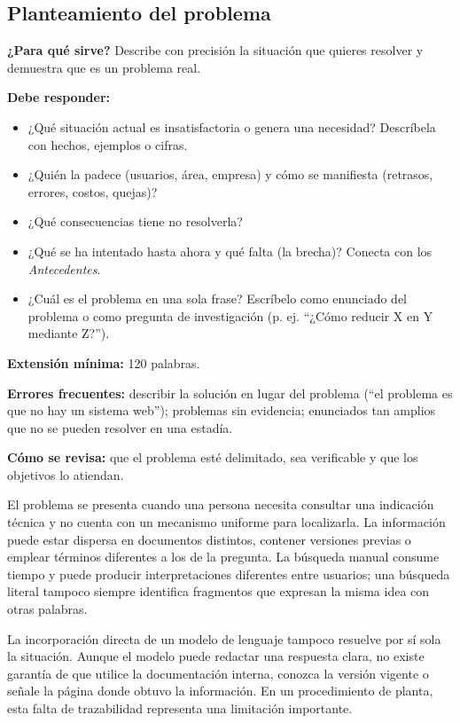\subsection{Planteamiento del problema} \label{sec:problema} %

\begin{guia}
\textbf{¿Para qué sirve?} Describe con precisión la situación que quieres resolver y demuestra que es un problema real.

\textbf{Debe responder:}
\begin{itemize}[nosep,leftmargin=*]
  \item ¿Qué situación actual es insatisfactoria o genera una necesidad? Descríbela con hechos, ejemplos o cifras.
  \item ¿Quién la padece (usuarios, área, empresa) y cómo se manifiesta (retrasos, errores, costos, quejas)?
  \item ¿Qué consecuencias tiene no resolverla?
  \item ¿Qué se ha intentado hasta ahora y qué falta (la brecha)? Conecta con los \emph{Antecedentes}.
  \item ¿Cuál es el problema en una sola frase? Escríbelo como enunciado del problema o como pregunta de
        investigación (p. ej. ``¿Cómo reducir X en Y mediante Z?'').
\end{itemize}

\textbf{Extensión mínima:} 120 palabras.

\textbf{Errores frecuentes:} describir la solución en lugar del problema (``el problema es que no hay un sistema web'');
problemas sin evidencia; enunciados tan amplios que no se pueden resolver en una estadía.

\textbf{Cómo se revisa:} que el problema esté delimitado, sea verificable y que los objetivos lo atiendan.
\end{guia}

El problema se presenta cuando una persona necesita consultar una indicación técnica y no cuenta con un mecanismo uniforme para localizarla. La información puede estar dispersa en documentos distintos, contener versiones previas o emplear términos diferentes a los de la pregunta. La búsqueda manual consume tiempo y puede producir interpretaciones diferentes entre usuarios; una búsqueda literal tampoco siempre identifica fragmentos que expresan la misma idea con otras palabras.

La incorporación directa de un modelo de lenguaje tampoco resuelve por sí sola la situación. Aunque el modelo puede redactar una respuesta clara, no existe garantía de que utilice la documentación interna, conozca la versión vigente o señale la página donde obtuvo la información. En un procedimiento de planta, esta falta de trazabilidad representa una limitación importante.

